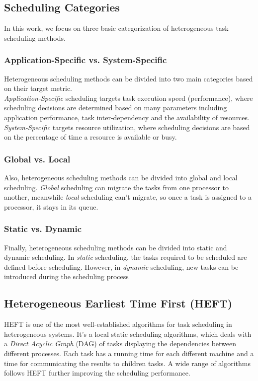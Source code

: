 \documentclass[twocolumn,11pt]{IEEEtran}
\begin{document}
\subsection{Scheduling Categories}
In this work, we focus on three basic categorization of heterogeneous task scheduling methods.

\subsubsection{Application-Specific vs. System-Specific}
Heterogeneous scheduling methods can be divided into two main categories based on their target metric.\\
\emph{Application-Specific} scheduling targets task execution speed (performance), where scheduling
decisions are determined based on many parameters including application performance, task inter-dependency and the availability of resources. \emph{System-Specific} targets resource utilization, where scheduling decisions are based on the percentage of time a resource is available or busy.

\subsubsection{Global vs. Local}
Also, heterogeneous scheduling methods can be divided into global and local scheduling. \emph{Global} scheduling can migrate the tasks from one processor to another, meanwhile \emph{local} scheduling can't migrate, so once a task is assigned to a processor, it stays in its queue.  

\subsubsection{Static vs. Dynamic}
Finally, heterogeneous scheduling methods can be divided into static and dynamic scheduling. In \emph{static} scheduling, the tasks required to be scheduled are defined before scheduling. However, in \emph{dynamic} scheduling, new tasks can be introduced during the scheduling process

\subsection{Heterogeneous Earliest Time First (HEFT)}
HEFT \cite{993206} is one of the most well-established algorithms for task scheduling in heterogeneous systems. It's a local static scheduling algorithms, which deals with a \emph{Direct Acyclic Graph} (DAG) of tasks displaying the dependencies between different processes. Each task has a running time for each different machine and a time for communicating the results to children tasks. A wide range of algorithms \cite{inbook} follows HEFT further improving the scheduling performance.
\end{document}
